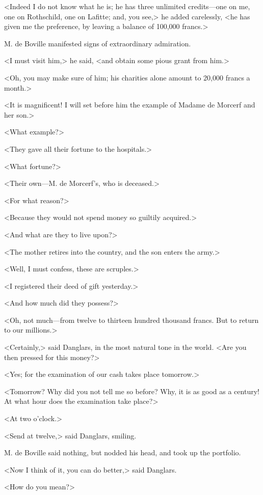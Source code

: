  <Indeed I do not know what he is; he has three unlimited credits—one on me, one on Rothschild, one on Lafitte; and, you see,> he added carelessly, <he has given me the preference, by leaving a balance of 100,000 francs.> 

 M. de Boville manifested signs of extraordinary admiration. 

 <I must visit him,> he said, <and obtain some pious grant from him.> 

 <Oh, you may make sure of him; his charities alone amount to 20,000 francs a month.> 

 <It is magnificent! I will set before him the example of Madame de Morcerf and her son.> 

 <What example?> 

 <They gave all their fortune to the hospitals.> 

 <What fortune?> 

 <Their own—M. de Morcerf's, who is deceased.> 

 <For what reason?> 

 <Because they would not spend money so guiltily acquired.> 

 <And what are they to live upon?> 

 <The mother retires into the country, and the son enters the army.>

<Well, I must confess, these are scruples.> 

 <I registered their deed of gift yesterday.> 

 <And how much did they possess?> 

 <Oh, not much—from twelve to thirteen hundred thousand francs. But to return to our millions.> 

 <Certainly,> said Danglars, in the most natural tone in the world. <Are you then pressed for this money?> 

 <Yes; for the examination of our cash takes place tomorrow.> 

 <Tomorrow? Why did you not tell me so before? Why, it is as good as a century! At what hour does the examination take place?> 

 <At two o'clock.> 

 <Send at twelve,> said Danglars, smiling. 

 M. de Boville said nothing, but nodded his head, and took up the portfolio. 

 <Now I think of it, you can do better,> said Danglars. 

 <How do you mean?> 


